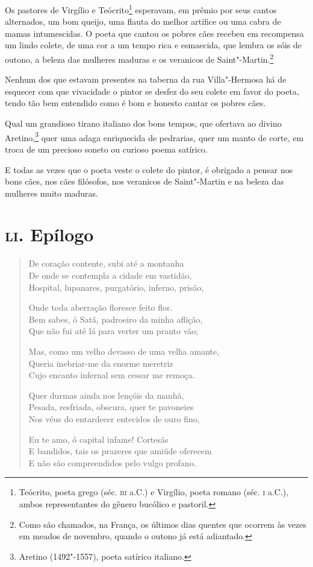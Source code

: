 Os pastores de Virgílio e Teócrito\footnote{ Teócrito, poeta grego (séc. 
\textsc{iii} a.C.) e Virgílio, poeta romano (séc. \textsc{i} a.C.), 
ambos representantes do gênero bucólico e pastoril.} esperavam, em
prêmio por seus cantos alternados, um bom queijo, uma flauta do melhor
artífice ou uma cabra de mamas intumescidas. O poeta que cantou os
pobres cães recebeu em recompensa um lindo colete, de uma cor a um
tempo rica e esmaecida, que lembra os sóis de outono, a beleza das
mulheres maduras e os veranicos de Saint"-Martin.\footnote{ Como são chamados, na França, os
últimos dias quentes que ocorrem às vezes em meados de novembro, quando
o outono já está adiantado.}

Nenhum dos que estavam presentes na taberna da rua Villa"-Hermosa
há de esquecer com que vivacidade o pintor se desfez do seu colete em favor
do poeta, tendo tão bem entendido como é bom e honesto cantar os pobres
cães.

Qual um grandioso tirano italiano dos bons tempos, que ofertava ao divino
Aretino,\footnote{ Aretino (1492"-1557), poeta satírico italiano.}
quer uma adaga enriquecida de pedrarias,
quer um manto de corte, em troca de um precioso soneto ou curioso
poema satírico.

E todas as vezes que o poeta veste o colete do pintor, é obrigado a
pensar nos bons cães, nos cães filósofos, nos veranicos de
Saint"-Martin e na beleza das mulheres muito maduras.

\chapter{\textsc{li.} Epílogo}

\begin{verse}
De coração contente, subi até a montanha\\
De onde se contempla a cidade em vastidão,\\
Hospital, lupanares, purgatório, inferno, prisão,

Onde toda aberração floresce feito flor.\\
Bem sabes, ó Satã, padroeiro da minha aflição,\\
Que não fui até lá para verter um pranto vão;

Mas, como um velho devasso de uma velha amante,\\
Queria inebriar-me da enorme meretriz\\
Cujo encanto infernal sem cessar me remoça.

Quer durmas ainda nos lençóis da manhã,\\
Pesada, resfriada, obscura, quer te pavoneies\\ 
Nos véus do entardecer entecidos de ouro fino,

Eu te amo, ó capital infame! Cortesãs\\
E bandidos, tais os prazeres que amiúde oferecem\\
E não são compreendidos pelo vulgo profano.
\end{verse}

